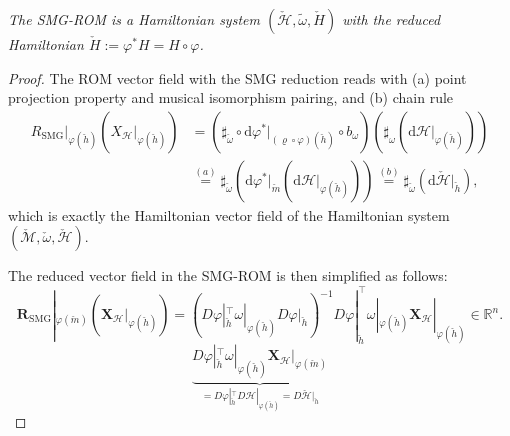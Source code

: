 \documentclass[10pt,a4paper]{amsart}
\begin{document}
\begin{theorem}
\label{thm: SMG}
\textit{The SMG-ROM is a Hamiltonian system $(\check{\mathcal{H}}, \tilde{\omega}, \check{H})$ with the reduced Hamiltonian $\check{H} := \varphi^* H = H\circ \varphi$.}    
\end{theorem}

\begin{proof}
The ROM vector field with the SMG reduction reads with (a) point projection property and musical isomorphism pairing, and (b) chain rule
\begin{align}
R_{\text{SMG}}|_{\varphi(\check{h})}\left(X_\mathcal{H}|_{\varphi(\check{h})}\right) &= \left(\sharp_{\check{\omega}} \circ \mathrm{d}\varphi^*|_{(\varrho \circ \varphi)(\check{h})} \circ b_\omega\right)\left(\sharp_\omega\left(\mathrm{d}\mathcal{H}|_{\varphi(\check{h})}\right)\right) \\
&\stackrel{(a)}{=} \sharp_{\check{\omega}}\left(\mathrm{d}\varphi^*|_{\check{m}}\left(\mathrm{d}\mathcal{H}|_{\varphi(\check{h})}\right)\right) \stackrel{(b)}{=} \sharp_{\check{\omega}}\left(\mathrm{d}\check{\mathcal{H}}|_{\check{h}}\right), \nonumber
\end{align}
which is exactly the Hamiltonian vector field of the Hamiltonian system $(\check{\mathcal{M}}, \check{\omega}, \check{\mathcal{H}})$. 

The reduced vector field in the SMG-ROM is then simplified as follows:
\begin{equation}
\boldsymbol{R}_{\text{SMG}}|_{\varphi(\check{m})}\left(\boldsymbol{X}_\mathcal{H}|_{\varphi(\check{h})}\right) = \left(D\varphi|_{\check{h}}^{\top} \omega|_{\varphi(\check{h})} D\varphi|_{\check{h}}\right)^{-1} D\varphi|_{\check{h}}^{\top} \omega|_{\varphi(\check{h})} \boldsymbol{X}_\mathcal{H}|_{\varphi(\check{h})} \in \mathbb{R}^n. 
\end{equation}
\begin{equation*}
\underbrace{D\varphi|_{\check{h}}^{\top} \omega|_{\varphi(\check{h})} \boldsymbol{X}_\mathcal{H}|_{\varphi(\check{m})}}_{= D\varphi|_{\check{h}}^{\top} D\mathcal{H}|_{\varphi(\check{h})} = D\check{\mathcal{H}}|_{\check{h}}}
\end{equation*}
\end{proof}
\end{document}
